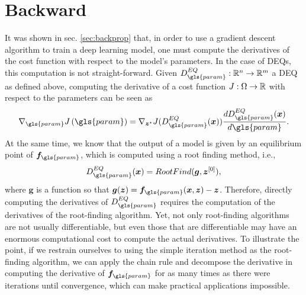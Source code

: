 \section{Backward}\label{sec:deq-backward}

It was shown in sec. \ref{sec:backprop} that, in order to use a gradient descent algorithm to train a deep learning model, one must compute the derivatives of the cost function with respect to the model's parameters.
In the case of \gls{DEQ}s, this computation is not straight-forward.
Given $D^{EQ}_{\gls{param}}:\R^{n}\to \R^{m}$ a \gls{DEQ} as defined above, computing the derivative of a cost function $J:\Omega\to \mathbb{R}$ with respect to the parameters can be seen as \[
    \nabla_{\gls{param}} J\left( \gls{param} \right) = \nabla_{\bm{z}^{\star}} J(D^{EQ}_{\gls{param}}(\bm{x})) \frac{d D^{EQ}_{\gls{param}}(\bm{x})}{d\gls{param}}
.\] 
At the same time, we know that the output of a model is given by an equilibrium point of $\bm{f}_{\gls{param}}$, which is computed using a root finding method, i.e., \[
    D^{EQ}_{\gls{param}}(\bm{x}) = RootFind(\bm{g}, \bm{z}^{[0]})
,\] where $\bm{g}$ is a function so that $\bm{g}(\bm{z}) = \bm{f}_{\gls{param}}(\bm{x},\bm{z}) - \bm{z}$.
Therefore, directly computing the derivatives of $D^{EQ}_{\gls{param}}$ requires the computation of the derivatives of the root-finding algorithm.
Yet, not only root-finding algorithms are not usually differentiable, but even those that are differentiable may have an enormous computational cost to compute the actual derivatives.
To illustrate the point, if we restrain ourselves to using the simple iteration method as the root-finding algorithm, we can apply the chain rule and decompose the derivative in computing the derivative of $\bm{f}_{\gls{param}}$ for as many times as there were iterations until convergence, which can make practical applications impossible.


